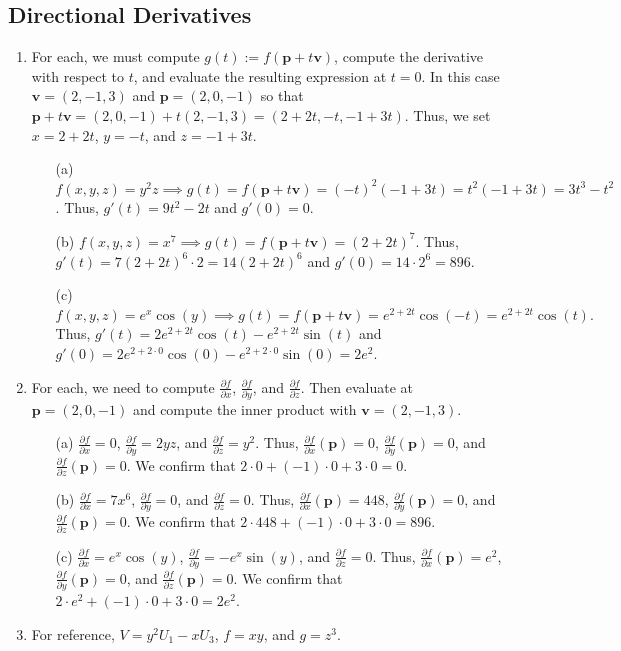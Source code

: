 \documentclass[12pt]{article}
\newcommand{\dfdx}{\frac{\partial f}{\partial x}}
\newcommand{\dfdy}{\frac{\partial f}{\partial y}}
\newcommand{\dfdz}{\frac{\partial f}{\partial z}}
\numberwithin{theorem}{section}
\numberwithin{equation}{section}
\numberwithin{remark}{section}
\numberwithin{definition}{section}
\numberwithin{theorem}{section}
\numberwithin{lemma}{section}
\numberwithin{example}{section}
\begin{document}
\subsection{Directional Derivatives}
\begin{enumerate}
	\item{For each, we must compute $g(t):=f(\textbf{p}+t\textbf{v})$, compute the derivative with respect to $t$, and evaluate the resulting expression at $t=0$. In this case $\textbf{v}=(2,-1,3)$ and $\textbf{p}=(2,0,-1)$ so that $\textbf{p}+t\textbf{v}=(2,0,-1)+t(2,-1,3)=(2+2t,-t,-1+3t)$. Thus, we set $x=2+2t$, $y=-t$, and $z=-1+3t$.
		\begin{enumerate}
			\item[(a)]{$f(x,y,z)=y^2z \implies g(t)=f(\textbf{p}+t\textbf{v})=(-t)^2(-1+3t)=t^2(-1+3t)=3t^3-t^2$. Thus, $g'(t)=9t^2-2t$ and $g'(0)=0$.}
			\item[(b)]{$f(x,y,z)=x^7 \implies g(t)=f(\textbf{p}+t\textbf{v})=(2+2t)^7$. Thus, $g'(t)=7(2+2t)^6\cdot 2= 14(2+2t)^6$ and $g'(0)=14\cdot 2^6=896$.}
			\item[(c)]{$f(x,y,z)=e^x\cos(y) \implies g(t)=f(\textbf{p}+t\textbf{v}) = e^{2+2t}\cos(-t)=e^{2+2t}\cos(t).$ Thus, $g'(t)=2e^{2+2t}\cos(t)-e^{2+2t}\sin(t)$ and $g'(0)=2e^{2+2\cdot 0}\cos(0)-e^{2+2\cdot 0}\sin(0)=2e^2$.}
		\end{enumerate}
	}
	\item{For each, we need to compute $\dfdx$, $\dfdy$, and $\dfdz$. Then evaluate at $\textbf{p}=(2,0,-1)$ and compute the inner product with $\textbf{v}=(2,-1,3)$.
		\begin{enumerate}
			\item[(a)]{$\dfdx=0$, $\dfdy=2yz$, and $\dfdz=y^2$. Thus, $\dfdx(\textbf{p})=0$, $\dfdy(\textbf{p})=0$, and $\dfdz(\textbf{p})=0$. We confirm that $2 \cdot 0 + (-1) \cdot 0 + 3 \cdot 0 = 0$.}
			\item[(b)]{$\dfdx=7x^6$, $\dfdy=0$, and $\dfdz=0$. Thus, $\dfdx(\textbf{p})=448$, $\dfdy(\textbf{p})=0$, and $\dfdz(\textbf{p})=0$. We confirm that $2 \cdot 448 + (-1) \cdot 0 + 3 \cdot 0 = 896$.}
			\item[(c)]{$\dfdx=e^x\cos(y)$, $\dfdy=-e^x\sin(y)$, and $\dfdz=0$. Thus, $\dfdx(\textbf{p})=e^2$, $\dfdy(\textbf{p})=0$, and $\dfdz(\textbf{p})=0$. We confirm that $2 \cdot e^2 + (-1) \cdot 0 + 3 \cdot 0 = 2e^2$.}
		\end{enumerate}
	}
	\item{For reference, $V=y^2U_1-xU_3$, $f=xy$, and $g=z^3$.
		\begin{enumerate}

\end{enumerate}}
\end{enumerate}
\end{document}
